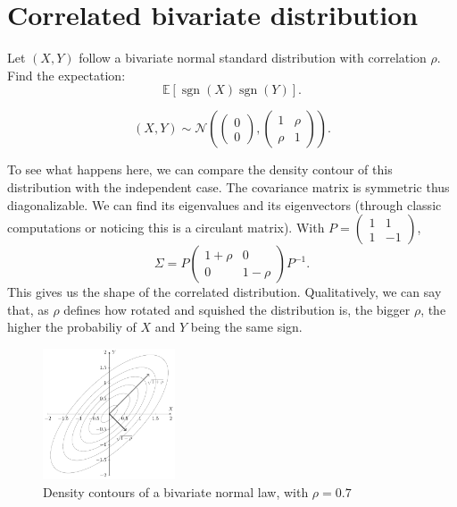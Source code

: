 \section{Correlated bivariate distribution}

\begin{tcolorbox}[width=\linewidth, sharp corners=all, colback=white!95!black]
Let $(X,Y)$ follow a bivariate normal standard distribution with correlation $\rho$. Find the expectation: $$\mathbb{E}[\operatorname{sgn}(X)\operatorname{sgn}(Y)].$$
\end{tcolorbox}

$$(X,Y) \sim \mathcal{N}\left(\begin{pmatrix}0\\0\end{pmatrix}, \begin{pmatrix}
1 & \rho\\ \rho & 1
\end{pmatrix}\right).$$

To see what happens here, we can compare the density contour of this distribution with the independent case. The covariance matrix is symmetric thus diagonalizable. We can find its eigenvalues and its eigenvectors (through classic computations or noticing this is a circulant matrix). With $P = \begin{pmatrix}
1 & 1\\ 1 & -1
\end{pmatrix}$,
$$\Sigma = P\begin{pmatrix}
1+\rho & 0\\ 0 & 1-\rho
\end{pmatrix}P^{-1}.$$
This gives us the shape of the correlated distribution. Qualitatively, we can say that, as $\rho$ defines how rotated and squished the distribution is, the bigger $\rho$, the higher the probabiliy of $X$ and $Y$ being the same sign.

\begin{figure}[H]
\includegraphics[width=0.35\textwidth]{img/tikz/bivariate_contour.pdf}
\centering
\caption{Density contours of a bivariate normal law, with $\rho=0.7$}
\label{fig:bivariate_contour}
\end{figure}


